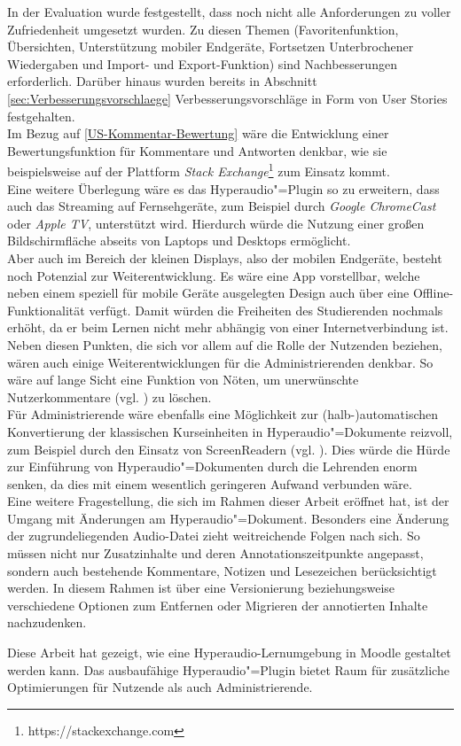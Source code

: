 In der Evaluation wurde festgestellt, dass noch nicht alle Anforderungen zu voller Zufriedenheit umgesetzt wurden. Zu diesen Themen (Favoritenfunktion, Übersichten, Unterstützung mobiler Endgeräte, Fortsetzen Unterbrochener Wiedergaben und Import- und Export-Funktion) sind Nachbesserungen erforderlich. Darüber hinaus wurden bereits in Abschnitt \ref{sec:Verbesserungsvorschlaege} Verbesserungsvorschläge in Form von User Stories festgehalten.\\
Im Bezug auf \ref{US-Kommentar-Bewertung} wäre die Entwicklung einer Bewertungsfunktion für Kommentare und Antworten denkbar, wie sie beispielsweise auf der Plattform \textit{Stack Exchange}\footnote{https://stackexchange.com} zum Einsatz kommt.\\
Eine weitere Überlegung wäre es das Hyperaudio"=Plugin so zu erweitern, dass auch das Streaming auf Fernsehgeräte, zum Beispiel durch \textit{Google ChromeCast} oder \textit{Apple TV}, unterstützt wird. Hierdurch würde die Nutzung einer großen Bildschirmfläche abseits von Laptops und Desktops ermöglicht.\\
Aber auch im Bereich der kleinen Displays, also der mobilen Endgeräte, besteht noch Potenzial zur Weiterentwicklung. Es wäre eine App vorstellbar, welche neben einem speziell für mobile Geräte ausgelegten Design auch über eine Offline-Funktionalität verfügt. Damit würden die Freiheiten des Studierenden nochmals erhöht, da er beim Lernen nicht mehr abhängig von einer Internetverbindung ist.\\
Neben diesen Punkten, die sich vor allem auf die Rolle der Nutzenden beziehen, wären auch einige Weiterentwicklungen für die Administrierenden denkbar. So wäre auf lange Sicht eine Funktion von Nöten, um unerwünschte Nutzerkommentare (vgl. \cite{reinmann2002analyse}) zu löschen.\\
Für Administrierende wäre ebenfalls eine Möglichkeit zur (halb-)automatischen Konvertierung der klassischen Kurseinheiten in Hyperaudio"=Dokumente reizvoll, zum Beispiel durch den Einsatz von ScreenReadern (vgl. \cite{donker2007gestaltung}). Dies würde die Hürde zur Einführung von Hyperaudio"=Dokumenten durch die Lehrenden enorm senken, da dies mit einem wesentlich geringeren Aufwand verbunden wäre.\\
Eine weitere Fragestellung, die sich im Rahmen dieser Arbeit eröffnet hat, ist der Umgang mit Änderungen am Hyperaudio"=Dokument. Besonders eine Änderung der zugrundeliegenden Audio-Datei zieht weitreichende Folgen nach sich. So müssen nicht nur Zusatzinhalte und deren Annotationszeitpunkte angepasst, sondern auch bestehende Kommentare, Notizen und Lesezeichen berücksichtigt werden. In diesem Rahmen ist über eine Versionierung beziehungsweise verschiedene Optionen zum Entfernen oder Migrieren der annotierten Inhalte nachzudenken.

Diese Arbeit hat gezeigt, wie eine Hyperaudio-Lernumgebung in Moodle gestaltet werden kann. Das ausbaufähige Hyperaudio"=Plugin bietet Raum für zusätzliche Optimierungen für Nutzende als auch Administrierende.
